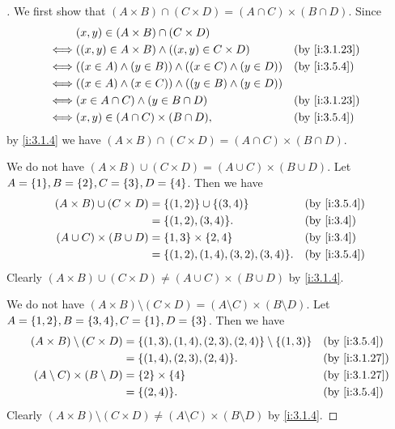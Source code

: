 \begin{proof}[]
  We first show that \((A \times B) \cap (C \times D) = (A \cap C) \times (B \cap D)\).
  Since
  \begin{align*}
         & (x, y) \in (A \times B) \cap (C \times D)                                        \\
    \iff & ((x, y) \in A \times B) \land ((x, y) \in C \times D)         &  & \by{i:3.1.23} \\
    \iff & ((x \in A) \land (y \in B)) \land ((x \in C) \land (y \in D)) &  & \by{i:3.5.4}  \\
    \iff & ((x \in A) \land (x \in C)) \land ((y \in B) \land (y \in D))                    \\
    \iff & (x \in A \cap C) \land (y \in B \cap D)                       &  & \by{i:3.1.23} \\
    \iff & (x, y) \in (A \cap C) \times (B \cap D),                      &  & \by{i:3.5.4}
  \end{align*}
  by \cref{i:3.1.4} we have \((A \times B) \cap (C \times D) = (A \cap C) \times (B \cap D)\).

  We do not have \((A \times B) \cup (C \times D) = (A \cup C) \times (B \cup D)\).
  Let \(A = \set{1}, B = \set{2}, C = \set{3}, D = \set{4}\).
  Then we have
  \begin{align*}
    (A \times B) \cup (C \times D) & = \set{(1, 2)} \cup \set{(3, 4)}        &  & \by{i:3.5.4} \\
                                   & = \set{(1, 2), (3, 4)}.                 &  & \by{i:3.4}   \\
    (A \cup C) \times (B \cup D)   & = \set{1, 3} \times \set{2, 4}          &  & \by{i:3.4}   \\
                                   & = \set{(1, 2), (1, 4), (3, 2), (3, 4)}. &  & \by{i:3.5.4}
  \end{align*}
  Clearly \((A \times B) \cup (C \times D) \neq (A \cup C) \times (B \cup D)\) by \cref{i:3.1.4}.

  We do not have \((A \times B) \setminus (C \times D) = (A \setminus C) \times (B \setminus D)\).
  Let \(A = \set{1, 2}, B = \set{3, 4}, C = \set{1}, D = \set{3}\).
  Then we have
  \begin{align*}
    (A \times B) \setminus (C \times D)    & = \set{(1, 3), (1, 4), (2, 3), (2, 4)} \setminus \set{(1, 3)} &  & \by{i:3.5.4}  \\
                                           & = \set{(1, 4), (2, 3), (2, 4)}.                               &  & \by{i:3.1.27} \\
    (A \setminus C) \times (B \setminus D) & = \set{2} \times \set{4}                                      &  & \by{i:3.1.27} \\
                                           & = \set{(2, 4)}.                                               &  & \by{i:3.5.4}
  \end{align*}
  Clearly \((A \times B) \setminus (C \times D) \neq (A \setminus C) \times (B \setminus D)\) by \cref{i:3.1.4}.
\end{proof}

